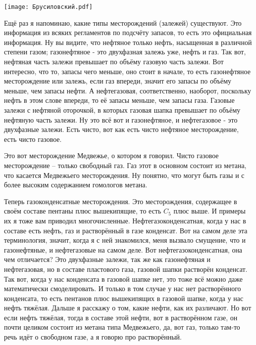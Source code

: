 \documentclass[main.tex]{subfiles}
\begin{document}
\begin{center}
\texttt{[image: Брусиловский.pdf]}
\end{center}

Ещё раз я напоминаю, какие типы месторождений (залежей) существуют.
Это информация из всяких регламентов по подсчёту запасов, то есть это официальная информация.
Ну вы видите, что нефтяное только нефть, насыщенная в различной степени газом; газонефтяное - это двухфазная залежь уже, нефть и газ.
Так вот, нефтяная часть залежи превышает по объёму газовую часть залежи.
Вот интересно, что то, запасы чего меньше, оно стоит в начале, то есть газонефтяное месторождение или залежь, если газ впереди, значит его запасы по объёму меньше, чем запасы нефти.
А нефтегазовая, соответственно, наоборот, поскольку нефть в этом слове впереди, то её запасы меньше, чем запасы газа.
Газовые залежи с нефтяной оторочкой, в которых газовая шапка превышает по объёму нефтяную часть залежи.
Ну это всё вот и газонефтяное, и нефтегазовое - это двухфазные залежи.
Есть чисто, вот как есть чисто нефтяное месторождение, есть чисто газовое.

Это вот месторождение Медвежье, о котором я говорил.
Чисто газовое месторождение -- только свободный газ.
Газ этот в основном состоит из метана, что касается Медвежьего месторождения.
Ну понятно, что могут быть газы и с более высоким содержанием гомологов метана.

Теперь газоконденсатные месторождения.
Это месторождения, содержащее в своём составе пентаны плюс вышекипящие, то есть $C_5$ плюс выше.
И примеры их я тоже вам приводил многочисленные.
Нефтегазоконденсатная, когда у нас в составе есть нефть, газ и растворённый в газе конденсат.
Вот на самом деле эта терминология, значит, когда я с ней знакомился, меня вызвало смущение, что и газонефтяные, и нефтегазовые на самом деле.
Вот нефтегазоконденсатная, она чем отличается?
Это двухфазные залежи, так же как газонефтяная и нефтегазовая, но в составе пластового газа, газовой шапки растворён конденсат.
Так вот, когда у нас конденсата в газовой шапке нет, это тоже всё можно даже математически смоделировать.
И только в том случае у нас нет растворённого конденсата, то есть пентанов плюс вышекипящих в газовой шапке, когда у нас нефть тяжёлая.
Дальше я расскажу о том, какие нефти, как их различают.
Но вот если нефть тяжёлая, тогда в составе этой нефти, вот в растворённом газе, он почти целиком состоит из метана типа Медвежьего, да, вот газ, только там-то речь идёт о свободном газе, а я говорю про растворённый.
\end{document}
